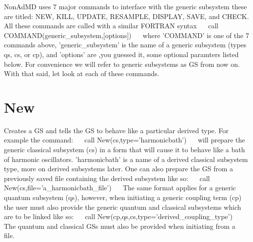 Non\+Ad\+M\+D uses 7 major commands to interface with the generic subsystem these are titled\+: N\+E\+W, K\+I\+L\+L, U\+P\+D\+A\+T\+E, R\+E\+S\+A\+M\+P\+L\+E, D\+I\+S\+P\+L\+A\+Y, S\+A\+V\+E, and C\+H\+E\+C\+K. All these commands are called with a similar F\+O\+R\+T\+R\+A\+N syntax~\newline
~\newline
call C\+O\+M\+M\+A\+N\+D(generic\+\_\+subsystem,\mbox{[}options\mbox{]})~\newline
~\newline
 where 'C\+O\+M\+M\+A\+N\+D' is one of the 7 commands above, 'generic\+\_\+subsystem' is the name of a generic subsystem (types qs, cs, or cp), and 'options' are ,you guessed it, some optional paramters listed below. For convenience we will refer to generic subsystems as G\+S from now on. With that said, let look at each of these commands.~\newline
\hypertarget{_interface_New}{}\section{New}\label{_interface_New}
Creates a G\+S and tells the G\+S to behave like a particular derived type. For example the command\+:~\newline
 ~\newline
 call New(cs,type='harmonicbath')~\newline
~\newline
will prepare the generic classical subsystem (cs) in a form that will cause it to behave like a bath of harmonic oscillators. 'harmonicbath' is a name of a derived classical subsystem type, more on derived subsystems later. One can also prepare the G\+S from a previously saved file containing the derived subsystem like so\+:~\newline
~\newline
 call New(cs,file='a\+\_\+harmonicbath\+\_\+file')~\newline
~\newline
The same format applies for a generic quantum subsystem (qs), however, when initiating a generic coupling term (cp) the user must also provide the generic quantum and classical subsystems which are to be linked like so\+:~\newline
~\newline
 call New(cp,qs,cs,type='derived\+\_\+coupling\+\_\+type')~\newline
~\newline
The quantum and classical G\+Ss must also be provided when initiating from a file.~\newline
